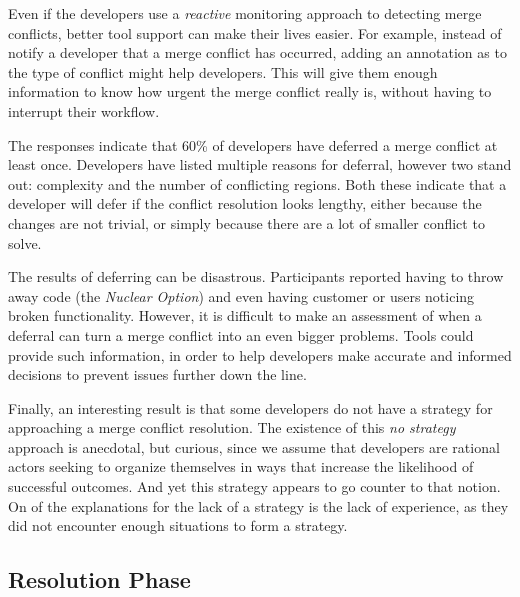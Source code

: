Even if the developers use a \emph{reactive} monitoring approach to detecting merge conflicts, better tool support can make their lives easier.
For example, instead of notify a developer that a merge conflict has occurred, adding an annotation as to the type of conflict might help developers.
This will give them enough information to know how urgent the merge conflict really is, without having to interrupt their workflow.

The responses indicate that 60\% of developers have deferred a merge conflict at least once. 
Developers have listed multiple reasons for deferral, however two stand out: complexity and the number of conflicting regions.
Both these indicate that a developer will defer if the conflict resolution looks lengthy, either because the changes are not trivial, or simply because there are a lot of smaller conflict to solve.

The results of deferring can be disastrous. 
Participants reported having to throw away code (the \emph{Nuclear Option}) and even having customer or users noticing broken functionality.
However, it is difficult to make an assessment of when a deferral can turn a merge conflict into an even bigger problems.
Tools could provide such information, in order to help developers make accurate and informed decisions to prevent issues further down the line.

Finally, an interesting result is that some developers do not have a strategy for approaching a merge conflict resolution.
The existence of this \textit{no strategy} approach is anecdotal, but curious, since we assume that developers are rational actors seeking to organize themselves in ways that increase the likelihood of successful outcomes.
And yet this strategy appears to go counter to that notion.
On of the explanations for the lack of a strategy is the lack of experience, as they did not encounter enough situations to form a strategy.

\subsection{Resolution Phase}


